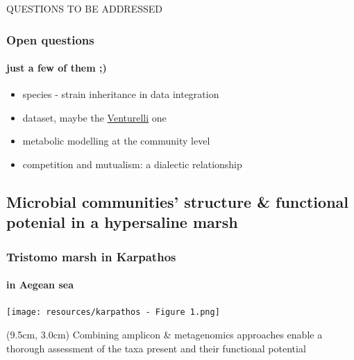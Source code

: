 \documentclass{beamer}
\begin{document}
   QUESTIONS TO BE ADDRESSED 
   \begin{frame}
      \frametitle{Open questions}
      \framesubtitle{just a few of them ;)  }

      \begin{itemize}
         
         \item species - strain inheritance in data integration
         \item dataset, maybe the \href{https://www.embopress.org/doi/full/10.15252/msb.20178157}{Venturelli} one 
         \item metabolic modelling at the community level
         \item competition and mutualism: a dialectic relationship
         
      \end{itemize}

   \end{frame}

   \fi

   \begin{darkframes}
      \section{
         Microbial communities' structure \& functional potenial in a hypersaline marsh
      }
   \end{darkframes}


   \begin{frame}
      \frametitle{Tristomo marsh in Karpathos}
      \framesubtitle{in Aegean sea}
      \texttt{[image: resources/karpathos - Figure 1.png]}

      \begin{textblock*}{3.0cm}(9.5cm, 3.0cm)
         Combining amplicon \& metagenomics approaches 
         enable a thorough assessment of the taxa present
         and their functional potential 
      \end{textblock*}

   \end{frame}


   \begin{frame}
      \frametitle{}
      \framesubtitle{}

   \end{frame}
\end{document}
